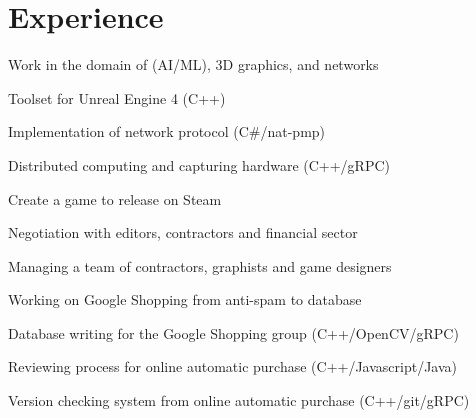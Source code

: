 \documentclass[a4paper]{deedy-resume} %
\begin{document}
\hfill%
%
%
\begin{minipage}[t]{0.66\textwidth} %


\section{Experience}


	Work in the domain of (AI/ML), 3D graphics, and networks
	\vspace{\topsep} %
	\begin{tightitemize}
		\item Toolset for Unreal Engine 4 (C++)
		\item Implementation of network protocol (C\#/nat-pmp)
		\item Distributed computing and capturing hardware (C++/gRPC)
	\end{tightitemize}

\sectionspace


	Create a game to release on Steam
	\begin{tightitemize}
		\item Negotiation with editors, contractors and financial sector
		\item Managing a team of contractors, graphists and game designers
	\end{tightitemize}

\sectionspace %


	Working on Google Shopping from anti-spam to database
	\begin{tightitemize}
		\item Database writing for the Google Shopping group (C++/OpenCV/gRPC)
		\item Reviewing process for online automatic purchase (C++/Javascript/Java)
		\item Version checking system from online automatic purchase (C++/git/gRPC)
	\end{tightitemize}


\end{minipage}
\end{document}
